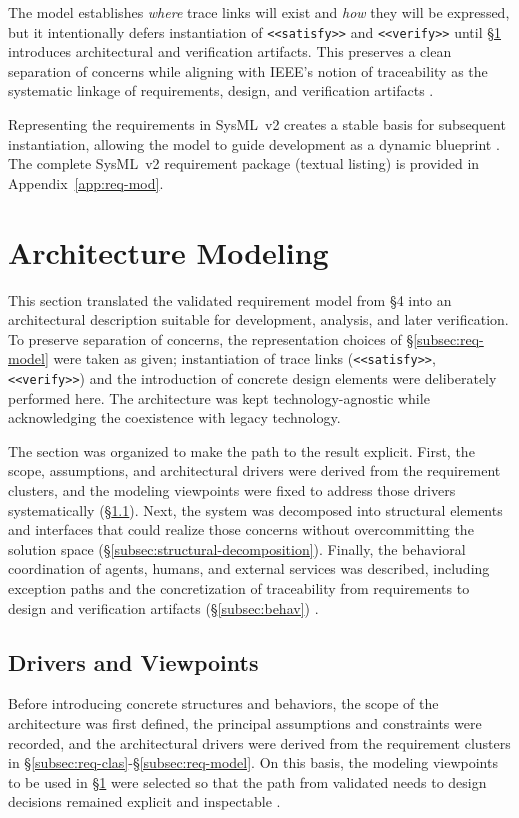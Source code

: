The model establishes \emph{where} trace links will exist and \emph{how} they will be expressed, but it intentionally defers instantiation of \texttt{<<satisfy>>} and \texttt{<<verify>>} until §\ref{sec:mod-mas} introduces architectural and verification artifacts. This preserves a clean separation of concerns while aligning with IEEE's notion of traceability as the systematic linkage of requirements, design, and verification artifacts \parencite{IEEEStandard1990}.

Representing the requirements in SysML~v2 creates a stable basis for subsequent instantiation, allowing the model to guide development as a dynamic blueprint \parencite{peffersDesign2007}. The complete SysML~v2 requirement package (textual listing) is provided in Appendix~\ref{app:req-mod}. %

\section{Architecture Modeling}\label{sec:mod-mas}
This section translated the validated requirement model from §4 into an architectural description suitable for development, analysis, and later verification. To preserve separation of concerns, the representation choices of §\ref{subsec:req-model} were taken as given; instantiation of trace links (\texttt{<<satisfy>>}, \texttt{<<verify>>}) and the introduction of concrete design elements were deliberately performed here. The architecture was kept technology-agnostic while acknowledging the coexistence with legacy technology.

The section was organized to make the path to the result explicit. First, the scope, assumptions, and architectural drivers were derived from the requirement clusters, and the modeling viewpoints were fixed to address those drivers systematically (§\ref{subsec:arch-drivers}). Next, the system was decomposed into structural elements and interfaces that could realize those concerns without overcommitting the solution space (§\ref{subsec:structural-decomposition}). Finally, the behavioral coordination of agents, humans, and external services was described, including exception paths and the concretization of traceability from requirements to design and verification artifacts (§\ref{subsec:behav}) \parencite{IEEEStandard1990,peffersDesign2007}.

\subsection{Drivers and Viewpoints}\label{subsec:arch-drivers}
Before introducing concrete structures and behaviors, the scope of the architecture was first defined, the principal assumptions and constraints were recorded, and the architectural drivers were derived from the requirement clusters in §\ref{subsec:req-clas}-§\ref{subsec:req-model}. On this basis, the modeling viewpoints to be used in §\ref{sec:mod-mas} were selected so that the path from validated needs to design decisions remained explicit and inspectable \parencite{peffersDesign2007}.

